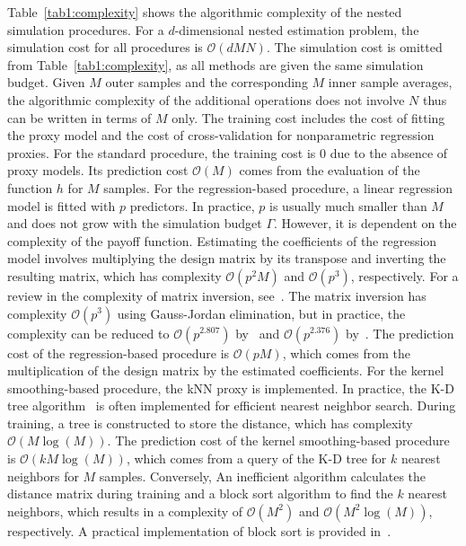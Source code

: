 Table~\ref{tab1:complexity} shows the algorithmic complexity of the nested simulation procedures.
For a $d$-dimensional nested estimation problem, the simulation cost for all procedures is $\mathcal{O}(dMN)$.
The simulation cost is omitted from Table~\ref{tab1:complexity}, as all methods are given the same simulation budget.
Given $M$ outer samples and the corresponding $M$ inner sample averages, the algorithmic complexity of the additional operations does not involve $N$ thus can be written in terms of $M$ only.
The training cost includes the cost of fitting the proxy model and the cost of cross-validation for nonparametric regression proxies.
For the standard procedure, the training cost is $0$ due to the absence of proxy models. 
Its prediction cost $\mathcal{O}(M)$ comes from the evaluation of the function $h$ for $M$ samples.
For the regression-based procedure, a linear regression model is fitted with $p$ predictors.
In practice, $p$ is usually much smaller than $M$ and does not grow with the simulation budget $\Gamma$.
However, it is dependent on the complexity of the payoff function.
Estimating the coefficients of the regression model involves multiplying the design matrix by its transpose and inverting the resulting matrix, which has complexity $\mathcal{O}(p^2M)$ and $\mathcal{O}(p^3)$, respectively.
For a review in the complexity of matrix inversion, see~\cite{stothers2010complexity}.
The matrix inversion has complexity $\mathcal{O}(p^3)$ using Gauss-Jordan elimination, but in practice, the complexity can be reduced to $\mathcal{O}(p^{2.807})$ by~\cite{strassen1969gaussian} and $\mathcal{O}(p^{2.376})$ by~\cite{coppersmith1987matrix}.
The prediction cost of the regression-based procedure is $\mathcal{O}(pM)$, which comes from the multiplication of the design matrix by the estimated coefficients.
For the kernel smoothing-based procedure, the kNN proxy is implemented.
In practice, the K-D tree algorithm~\citep{bentley1975multidimensional} is often implemented for efficient nearest neighbor search.
During training, a tree is constructed to store the distance, which has complexity $\mathcal{O}(M\log(M))$.
The prediction cost of the kernel smoothing-based procedure is $\mathcal{O}(kM\log(M))$, which comes from a query of the K-D tree for $k$ nearest neighbors for $M$ samples.
Conversely, An inefficient algorithm calculates the distance matrix during training and a block sort algorithm to find the $k$ nearest neighbors, which results in a complexity of $\mathcal{O}(M^2)$ and $\mathcal{O}(M^2\log(M))$, respectively.
A practical implementation of block sort is provided in~\cite{kim2008ratio}.
